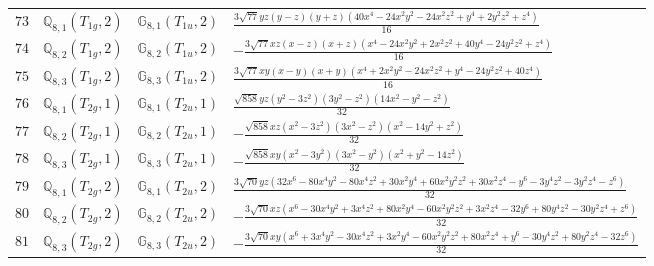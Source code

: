 \documentclass[fleqn,8pt,landscape]{jsarticle}
\begin{document}
\begin{table}[ht!]
\begin{center}
\begin{tabular}{cccl}
$ 73 $ & $ \mathbb{Q}_{8,1}(T_{1g},2) $ & $ \mathbb{G}_{8,1}(T_{1u},2) $ & $ \frac{3 \sqrt{77} y z \left(y - z\right) \left(y + z\right) \left(40 x^{4} - 24 x^{2} y^{2} - 24 x^{2} z^{2} + y^{4} + 2 y^{2} z^{2} + z^{4}\right)}{16} $ \\
$ 74 $ & $ \mathbb{Q}_{8,2}(T_{1g},2) $ & $ \mathbb{G}_{8,2}(T_{1u},2) $ & $ - \frac{3 \sqrt{77} x z \left(x - z\right) \left(x + z\right) \left(x^{4} - 24 x^{2} y^{2} + 2 x^{2} z^{2} + 40 y^{4} - 24 y^{2} z^{2} + z^{4}\right)}{16} $ \\
$ 75 $ & $ \mathbb{Q}_{8,3}(T_{1g},2) $ & $ \mathbb{G}_{8,3}(T_{1u},2) $ & $ \frac{3 \sqrt{77} x y \left(x - y\right) \left(x + y\right) \left(x^{4} + 2 x^{2} y^{2} - 24 x^{2} z^{2} + y^{4} - 24 y^{2} z^{2} + 40 z^{4}\right)}{16} $ \\
$ 76 $ & $ \mathbb{Q}_{8,1}(T_{2g},1) $ & $ \mathbb{G}_{8,1}(T_{2u},1) $ & $ \frac{\sqrt{858} y z \left(y^{2} - 3 z^{2}\right) \left(3 y^{2} - z^{2}\right) \left(14 x^{2} - y^{2} - z^{2}\right)}{32} $ \\
$ 77 $ & $ \mathbb{Q}_{8,2}(T_{2g},1) $ & $ \mathbb{G}_{8,2}(T_{2u},1) $ & $ - \frac{\sqrt{858} x z \left(x^{2} - 3 z^{2}\right) \left(3 x^{2} - z^{2}\right) \left(x^{2} - 14 y^{2} + z^{2}\right)}{32} $ \\
$ 78 $ & $ \mathbb{Q}_{8,3}(T_{2g},1) $ & $ \mathbb{G}_{8,3}(T_{2u},1) $ & $ - \frac{\sqrt{858} x y \left(x^{2} - 3 y^{2}\right) \left(3 x^{2} - y^{2}\right) \left(x^{2} + y^{2} - 14 z^{2}\right)}{32} $ \\
$ 79 $ & $ \mathbb{Q}_{8,1}(T_{2g},2) $ & $ \mathbb{G}_{8,1}(T_{2u},2) $ & $ \frac{3 \sqrt{70} y z \left(32 x^{6} - 80 x^{4} y^{2} - 80 x^{4} z^{2} + 30 x^{2} y^{4} + 60 x^{2} y^{2} z^{2} + 30 x^{2} z^{4} - y^{6} - 3 y^{4} z^{2} - 3 y^{2} z^{4} - z^{6}\right)}{32} $ \\
$ 80 $ & $ \mathbb{Q}_{8,2}(T_{2g},2) $ & $ \mathbb{G}_{8,2}(T_{2u},2) $ & $ - \frac{3 \sqrt{70} x z \left(x^{6} - 30 x^{4} y^{2} + 3 x^{4} z^{2} + 80 x^{2} y^{4} - 60 x^{2} y^{2} z^{2} + 3 x^{2} z^{4} - 32 y^{6} + 80 y^{4} z^{2} - 30 y^{2} z^{4} + z^{6}\right)}{32} $ \\
$ 81 $ & $ \mathbb{Q}_{8,3}(T_{2g},2) $ & $ \mathbb{G}_{8,3}(T_{2u},2) $ & $ - \frac{3 \sqrt{70} x y \left(x^{6} + 3 x^{4} y^{2} - 30 x^{4} z^{2} + 3 x^{2} y^{4} - 60 x^{2} y^{2} z^{2} + 80 x^{2} z^{4} + y^{6} - 30 y^{4} z^{2} + 80 y^{2} z^{4} - 32 z^{6}\right)}{32} $ \\
 \hline \hline
\end{tabular}
\end{center}
\end{table}
\end{document}
